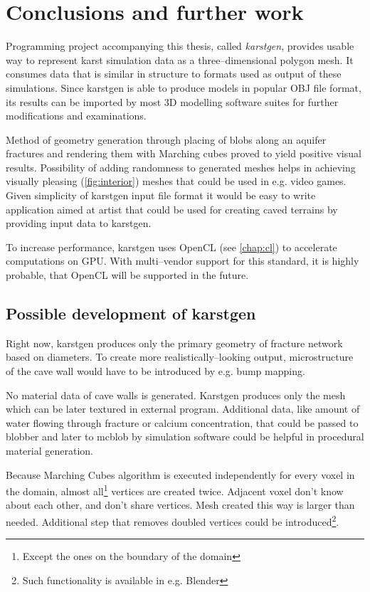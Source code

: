 \chapter{Conclusions and further work}
\label{chap:furtherwork}

Programming project accompanying this thesis, called \emph{karstgen}, provides
usable way to represent karst simulation data as a three--dimensional polygon
mesh. It consumes data that is similar in structure to formats used as output of
these simulations. Since karstgen is able to produce models in popular OBJ file
format, its results can be imported by most 3D modelling software suites for further
modifications and examinations.

Method of geometry generation through placing of blobs along an aquifer fractures
and rendering them with Marching cubes proved to yield positive visual results.
Possibility of adding randomness to generated meshes helps in achieving
visually pleasing (\autoref{fig:interior}) meshes that could be used in e.g.
video games. Given simplicity of karstgen input file format it would be easy to
write application aimed at artist that could be used for creating caved terrains
by providing input data to karstgen.

To increase performance, karstgen uses OpenCL (see \autoref{chap:cl}) to
accelerate computations on GPU. With multi--vendor support for this standard,
it is highly probable, that OpenCL will be supported in the future.

\section{Possible development of karstgen}

Right now, karstgen produces only the primary geometry of fracture network based
on diameters. To create more realistically--looking output, microstructure of
the cave wall would have to be introduced by e.g. bump mapping.

No material data of cave walls is generated. Karstgen produces only the mesh which
can be later textured in external program. Additional data, like amount of water
flowing through fracture or calcium concentration, that could be passed to blobber
and later to mcblob by simulation software could be helpful in procedural
material generation.

Because Marching Cubes algorithm is executed independently for every voxel in the
domain, almost all\footnote{Except the ones on the boundary of the domain}
vertices are created twice. Adjacent voxel don't know about
each other, and don't share vertices. Mesh created this way is larger than
needed. Additional step that removes doubled vertices could be
introduced\footnote{Such functionality is available in e.g. Blender}.

